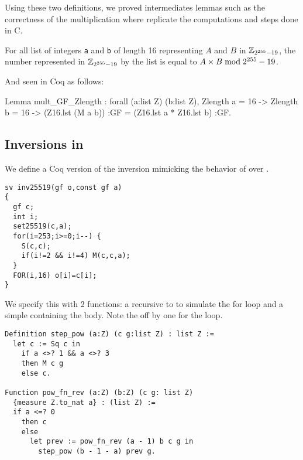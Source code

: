 Using these two definitions, we proved intermediates lemmas such as the correctness of the
multiplication  where  replicate the computations and steps done in C.
\begin{lemma}
For all list of integers \texttt{a} and \texttt{b} of length 16 representing
$A$ and $B$ in $\mathbb{Z}_{2^{255}-19}$, the number represented in $\mathbb{Z}_{2^{255}-19}$ by the list 
is equal to $A \times B \bmod 2^{255}-19$.
\end{lemma}
And seen in Coq as follows:
\begin{Coq}
Lemma mult_GF_Zlength :
  forall (a:list Z) (b:list Z),
  Zlength a = 16 ->
  Zlength b = 16 ->
   (Z16.lst (M a b)) :GF =
   (Z16.lst a * Z16.lst b) :GF.
\end{Coq}

\subsection{Inversions in \Zfield}

We define a Coq version of the inversion mimicking
the behavior of  over .
\begin{lstlisting}[language=Ctweetnacl]
sv inv25519(gf o,const gf a)
{
  gf c;
  int i;
  set25519(c,a);
  for(i=253;i>=0;i--) {
    S(c,c);
    if(i!=2 && i!=4) M(c,c,a);
  }
  FOR(i,16) o[i]=c[i];
}
\end{lstlisting}
We specify this with 2 functions: a recursive  to to simulate the for loop and a simple
 containing the body. Note the off by one for the loop.
\begin{lstlisting}[language=Coq]
Definition step_pow (a:Z) (c g:list Z) : list Z :=
  let c := Sq c in
    if a <>? 1 && a <>? 3
    then M c g
    else c.

Function pow_fn_rev (a:Z) (b:Z) (c g: list Z)
  {measure Z.to_nat a} : (list Z) :=
  if a <=? 0
    then c
    else
      let prev := pow_fn_rev (a - 1) b c g in
        step_pow (b - 1 - a) prev g.
\end{lstlisting}

